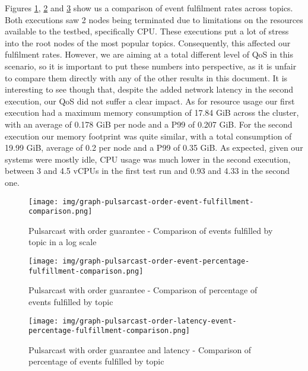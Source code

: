 Figures \ref{fig:graph-pulsarcast-order-event-fulfillment-comparison},
\ref{fig:graph-pulsarcast-order-event-percentage-fulfillment-comparison} and
\ref{fig:graph-pulsarcast-order-latency-event-percentage-fulfillment-comparison} show
us a comparison of event fulfilment rates across topics. Both executions saw 2
nodes being terminated due to limitations on the resources available to the
testbed, specifically CPU. These executions put a lot of stress into the root
nodes of the most popular topics. Consequently, this affected our fulfilment
rates. However, we are aiming at a total different level of QoS in this
scenario, so it is important to put these numbers into perspective, as it is
unfair to compare them directly with any of the other results in this document.
It is interesting to see though that, despite the added network latency in the
second execution, our QoS did not suffer a clear impact. As for resource usage
our first execution had a maximum memory consumption of 17.84 GiB across the
cluster, with an average of 0.178 GiB per node and a P99 of 0.207 GiB. For the
second execution our memory footprint was quite similar, with a total
consumption of 19.99 GiB, average of 0.2 per node and a P99 of 0.35 GiB. As
expected, given our systems were mostly idle, CPU usage was much lower in the
second execution, between 3 and 4.5 vCPUs in the first test run and 0.93 and
4.33 in the second one.

\begin{figure}[!htb]
  \centering
  \texttt{[image: img/graph-pulsarcast-order-event-fulfillment-comparison.png]}
  \caption{Pulsarcast with order guarantee - Comparison of events fulfilled by topic in a log scale}
  \label{fig:graph-pulsarcast-order-event-fulfillment-comparison}
\end{figure}

\begin{figure}[!htb]
  \centering
  \texttt{[image: img/graph-pulsarcast-order-event-percentage-fulfillment-comparison.png]}
  \caption{Pulsarcast with order guarantee - Comparison of percentage of events fulfilled by topic}
  \label{fig:graph-pulsarcast-order-event-percentage-fulfillment-comparison}
\end{figure}

\begin{figure}[!htb]
  \centering
  \texttt{[image: img/graph-pulsarcast-order-latency-event-percentage-fulfillment-comparison.png]}
  \caption{Pulsarcast with order guarantee and latency - Comparison of percentage of events fulfilled by topic}
  \label{fig:graph-pulsarcast-order-latency-event-percentage-fulfillment-comparison}
\end{figure}

